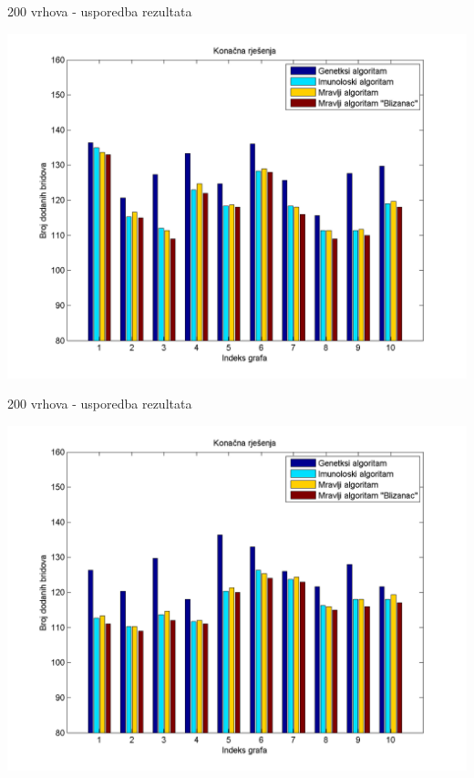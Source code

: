 \documentclass{beamer}
\begin{document}
\begin{frame}{200 vrhova - usporedba rezultata}
\begin{center}
\includegraphics[scale = 0.45]{drugih10.png}\\
\end{center}
\end{frame}

\begin{frame}{200 vrhova - usporedba rezultata}
\begin{center}
\includegraphics[scale = 0.45]{zadnjih10.png}\\
\end{center}
\end{frame}
\end{document}
